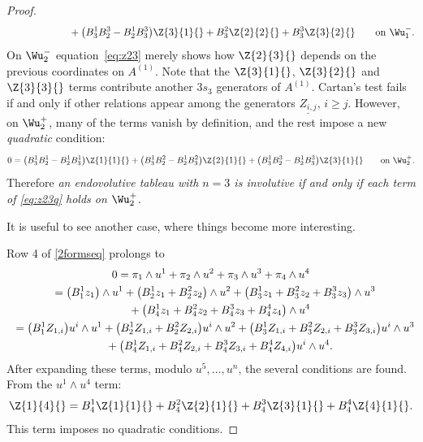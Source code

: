 \begin{proof}
\begin{gather}
\hphantom{\Z{2}{3}{}=}{}
+\big(B^{1}_{3}B^{3}_{2} - B^{1}_{2}B^{3}_{3}\big)\Z{3}{1}{}
+B^{2}_{3}\Z{2}{2}{} + B^{3}_{3}\Z{3}{2}{} \qquad \text{on
$\Wu^-_1$.}
\label{eq:z23}
\end{gather}
On $\Wu^-_2$ equation~\eqref{eq:z23} merely shows how
$\Z{2}{3}{}$ depends on the previous coordinates on $A^{(1)}$.  Note that the
$\Z{3}{1}{}$, $\Z{3}{2}{}$ and $\Z{3}{3}{}$ terms
contribute another $3s_3$ generators of $A^{(1)}$.  Cartan's test fails if and
only if other relations appear among the generators $\underline{Z_{i,j}}$, $i
\geq j$.
However, on $\Wu^+_2$, many of the terms vanish by def\/inition, and the rest
impose a new \emph{quadratic} condition:
\begin{gather}
0
= \big(B^{1}_{3}B^{1}_{2} - B^{1}_{2}B^{1}_{3}\big)\Z{1}{1}{}
+\big(B^{1}_{3}B^{2}_{2} - B^{1}_{2}B^{2}_{3}\big)\Z{2}{1}{}
+\big(B^{1}_{3}B^{3}_{2} - B^{1}_{2}B^{3}_{3}\big)\Z{3}{1}{} \qquad
\text{on $\Wu^+_2$.}
\label{eq:z23q}
\end{gather}
Therefore \emph{an endovolutive tableau with $n=3$ is involutive if and only if
each term of \eqref{eq:z23q} holds on $\Wu^+_2$.}

It is useful to see another case, where things become more interesting.

Row 4 of \eqref{2formseq} prolongs to
\begin{gather*}
0 =
\pi_1 \wedge u^1 + \pi_2 \wedge u^2 + \pi_3 \wedge u^3 + \pi_4\wedge u^4\\
\hphantom{0}{} =
    \big( B^{1}_{1} z_1 \big)\wedge u^1
   +\big( B^{1}_{2} z_1
         + B^{2}_{2} z_2 \big)\wedge u^2
   +\big( B^{1}_{3} z_1
         + B^{2}_{3} z_2
         + B^{3}_{3} z_3 \big)\wedge u^3 \\
\hphantom{0=}{}
   +\big( B^{1}_{4} z_1
         + B^{2}_{4} z_2
         + B^{3}_{4} z_3
         + B^{4}_{4} z_4 \big)\wedge u^4\\
\hphantom{0}{} =
    \big( B^{1}_{1} Z_{1,i} \big)u^i \wedge u^1
   +\big( B^{1}_{2} Z_{1,i}
         + B^{2}_{2} Z_{2,i} \big)u^i \wedge u^2
   +\big( B^{1}_{3} Z_{1,i}
         + B^{2}_{3} Z_{2,i}
         + B^{3}_{3} Z_{3,i} \big)u^i \wedge u^3\\
\hphantom{0=}{}
   +\big( B^{1}_{4} Z_{1,i}
         + B^{2}_{4} Z_{2,i}
         + B^{3}_{4} Z_{3,i}
         + B^{4}_{4} Z_{4,i} \big)u^i \wedge u^4.
\end{gather*}
After expanding these terms, modulo $u^5, \ldots, u^n$, the several conditions
are found.  From the $u^1 \wedge u^4$ term:
\begin{gather*}
\Z{1}{4}{} =
 B^{1}_{4}\Z{1}{1}{} + B^{2}_{4}\Z{2}{1}{} +
 B^{3}_{4}\Z{3}{1}{} + B^{4}_{4}\Z{4}{1}{}.
\end{gather*}
This term imposes no quadratic conditions.


\end{proof}
